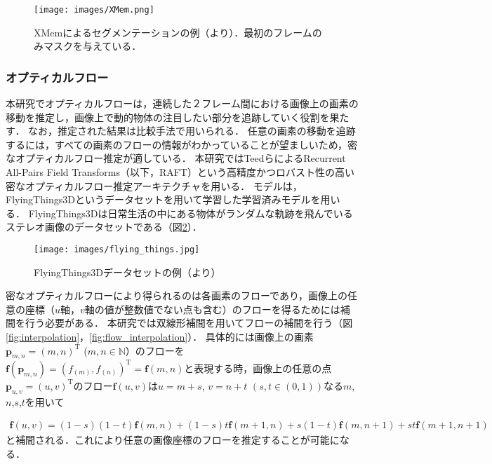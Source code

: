 \begin{figure}[h]
	\centering
	\texttt{[image: images/XMem.png]}
	\caption[XMemによるセグメンテーションの例]{XMemによるセグメンテーションの例（\cite{cheng2022xmem}より）．最初のフレームのみマスクを与えている．}
	\label{figure:XMem}
\end{figure}

\subsubsection{オプティカルフロー}\label{subsubsec:prepare_opticalflow}
本研究でオプティカルフローは，連続した２フレーム間における画像上の画素の移動を推定し，画像上で動的物体の注目したい部分を追跡していく役割を果たす．
なお，推定された結果は比較手法で用いられる．
任意の画素の移動を追跡するには，すべての画素のフローの情報がわかっていることが望ましいため，密なオプティカルフロー推定が適している．
本研究ではTeedら\cite{teed2020raft}によるRecurrent All-Pairs Field Transforms（以下，RAFT）という高精度かつロバスト性の高い密なオプティカルフロー推定アーキテクチャを用いる． 
モデルは，FlyingThings3D\cite{MIFDB16}というデータセットを用いて学習した学習済みモデルを用いる．
FlyingThings3Dは日常生活の中にある物体がランダムな軌跡を飛んでいるステレオ画像のデータセットである（図\ref{figure:flying_things}）．

\begin{figure}[h]
	\centering
	\texttt{[image: images/flying\_things.jpg]}
	\caption[FlyingThings3Dデータセットの例]{FlyingThings3Dデータセットの例（\cite{MIFDB16}より）}
	\label{figure:flying_things}
\end{figure}

密なオプティカルフローにより得られるのは各画素のフローであり，画像上の任意の座標（$u$軸，$v$軸の値が整数値でない点も含む）のフローを得るためには補間を行う必要がある．
本研究では双線形補間を用いてフローの補間を行う（図\ref{fig:interpolation}，\ref{fig:flow_interpolation}）．
具体的には画像上の画素$\mathbf{p}_{m,n}={(m,n)}^\mathrm{T}$ ($m,
n \in\mathbb{N}$）のフローを$\mathbf{f}(\mathbf{p}_{m,n})=(f_{(m)},f_{(n)})^\mathrm{T}=\mathbf{f}(m,n)$と表現する時，画像上の任意の点$\mathbf{p}_{u,v}={(u,v)}^\mathrm{T}$のフロー$\mathbf{f}(u,v)$は$u=m+s$, $v=n+t$ $(s,t\in(0,1))$なる$m$,$n$,$s$,$t$を用いて

\begin{equation}
	\label{eq:biliner}
	\begin{array}{l}
		\mathbf{f}(u,v)=(1-s)(1-t) \mathbf{f}\left(m, n\right) 
		+(1-s) t \mathbf{f}\left(m+1, n\right)
		+s(1-t) \mathbf{f}\left(m, n+1\right) 
		+s t \mathbf{f}\left(m+1, n+1\right)
	\end{array}
\end{equation}
と補間される．これにより任意の画像座標のフローを推定することが可能になる．

